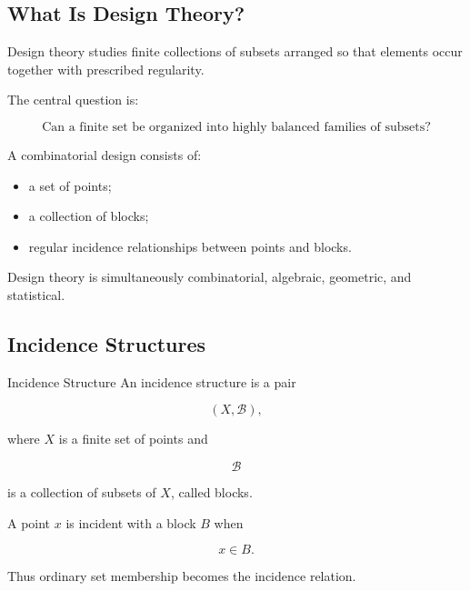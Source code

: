 \subsection{What Is Design Theory?}
\label{subsec:what-is-design-theory}

Design theory studies finite collections of subsets arranged so that
elements occur together with prescribed regularity.

The central question is:

\[
\boxed{
\text{Can a finite set be organized into highly balanced families of
subsets?}
}
\]

A combinatorial design consists of:

\begin{itemize}
    \item a set of points;
    \item a collection of blocks;
    \item regular incidence relationships between points and blocks.
\end{itemize}

Design theory is simultaneously combinatorial, algebraic, geometric,
and statistical.

\subsection{Incidence Structures}
\label{subsec:incidence-structures-design}

\begin{definitionbox}{Incidence Structure}
An incidence structure is a pair

\[
\boxed{
(X,\mathcal{B}),
}
\]

where \(X\) is a finite set of points and

\[
\mathcal{B}
\]

is a collection of subsets of \(X\), called blocks.
\end{definitionbox}

A point \(x\) is incident with a block \(B\) when

\[
\boxed{
x\in B.
}
\]

Thus ordinary set membership becomes the incidence relation.

